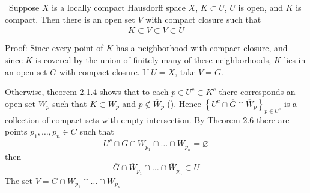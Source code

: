 \documentclass[12pt, a4paper, oneside]{book}
\begin{document}
\begin{theorem}\
    Suppose $X$ is a locally compact Hausdorff space $X$, $K \subset U$, $U$ is open, and $K$ is compact. Then there is an open set $V$ with compact closure such that
    $$K \subset V \subset \overline{V} \subset U$$

    Proof:
    Since every point of $K$ has a neighborhood with compact closure, and since $K$ is covered by the union of finitely many of these neighborhoods, $K$ lies in an open set $G$ with compact closure. If $U=X$, take $V=G$.

    Otherwise, theorem 2.1.4 shows that to each $p \in U^c\subset K^c$ there corresponds an open set $W_p$ such that $K \subset W_p$ and $p \notin \overline{W}_p$ (). Hence $\left\{U^c \cap \overline{G} \cap \overline{W}_p\right\}_{p\in U^c}$ is a collection of compact sets with empty intersection. By Theorem 2.6 there are points $p_1, \ldots, p_n \in C$ such that
    $$U^c \cap \overline{G} \cap \overline{W}_{p_1} \cap \ldots \cap \overline{W}_{p_n}=\varnothing$$
    then
    $$\overline{G} \cap \overline{W}_{p_1} \cap \ldots \cap \overline{W}_{p_n}\subset U $$
    The set $V=G \cap W_{p_1} \cap \ldots \cap W_{p_n}$
\end{theorem}
\end{document}
